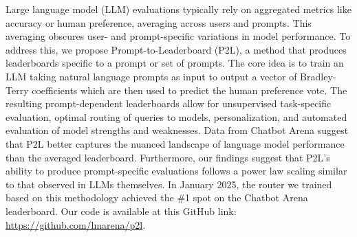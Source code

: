 Large language model (LLM) evaluations typically rely on aggregated metrics like accuracy or human preference, averaging across users and prompts. This averaging obscures user- and prompt-specific variations in model performance.
To address this, we propose Prompt-to-Leaderboard (P2L), a method that produces leaderboards specific to a prompt or set of prompts.
The core idea is to train an LLM taking natural language prompts as input to output a vector of Bradley-Terry coefficients which are then used to predict the human preference vote.
The resulting prompt-dependent leaderboards allow for unsupervised task-specific evaluation, optimal routing of queries to models, personalization, and automated evaluation of model strengths and weaknesses. 
Data from Chatbot Arena suggest that P2L better captures the nuanced landscape of language model performance than the averaged leaderboard. 
Furthermore, our findings suggest that P2L's ability to produce prompt-specific evaluations follows a power law scaling similar to that observed in LLMs themselves. In January 2025, the router we trained based on this methodology achieved the \#1 spot on the Chatbot Arena leaderboard. Our code is available at this GitHub link: \url{https://github.com/lmarena/p2l}.